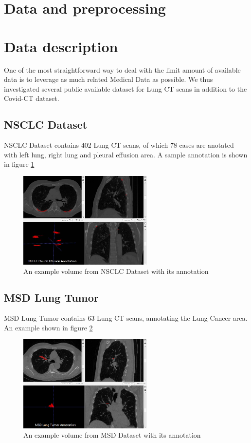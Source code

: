 \section{Data and preprocessing}
\section{Data description}
One of the most straightforward way to deal with the limit amount of available data is to leverage as much related Medical Data as possible. We thus investigated several public available dataset for Lung CT scans in addition to the Covid-CT dataset.

\subsection{NSCLC Dataset}
NSCLC Dataset contains 402 Lung CT scans, of which 78 cases are anotated with left lung, right lung and pleural effusion area. A sample annotation is shown in figure \ref{fig:NSCLC_example}
\begin{figure}[h]
	\centering
	\includegraphics[width=0.6\textwidth]{img/Dataset/NSCLC}
	\caption{An example volume from NSCLC Dataset with its annotation}
	\label{fig:NSCLC_example}
\end{figure}

\subsection{MSD Lung Tumor}
MSD Lung Tumor contains 63 Lung CT scans, annotating the Lung Cancer area. An example shown in figure \ref{fig:MSD_example}
\begin{figure}[h]
	\centering
	\includegraphics[width=0.6\textwidth]{img/Dataset/MSD}
	\caption{An example volume from MSD Dataset with its annotation}
	\label{fig:MSD_example}
\end{figure}

